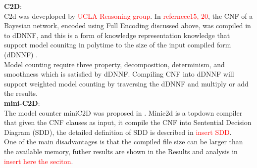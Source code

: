     \textbf{C2D}:\\
    C2d was deveploped by \textcolor{red}{UCLA Reasoning group}. In \textcolor{red}{refernece15, 20}, the CNF of a Bayesian network, encoded using Full Encoding discussed above, was compiled in to d\-DNNF, and this is a form of knowledge representation knowledge that support model counitng in poly\-time to the size of the input compiled form (d\-DNNF) \cite{2002language-map}.\\
    Model counting require three property, decomposition, determinism, and smoothness which is satisfied by d\-DNNF. Compiling CNF into d\-DNNF will support weighted model counting by traversing the d\-DNNF and multiply or add the results.\\
    
    \textbf{mini-C2D}:\\
    The model counter mini\-C2D was proposed in \cite{minic2d}. Minic2d is a top\-down compiler that given the CNF clauses as input, it compile the CNF into Sentential Decision Diagram (SDD), the detailed definition of SDD is described in \textcolor{red}{insert SDD}. \\
    One of the main disadvantages is that the compiled file size can be larger than the available memory, futher results are shown in the Results and analysis in \textcolor{red}{insert here the seciton}.
    
